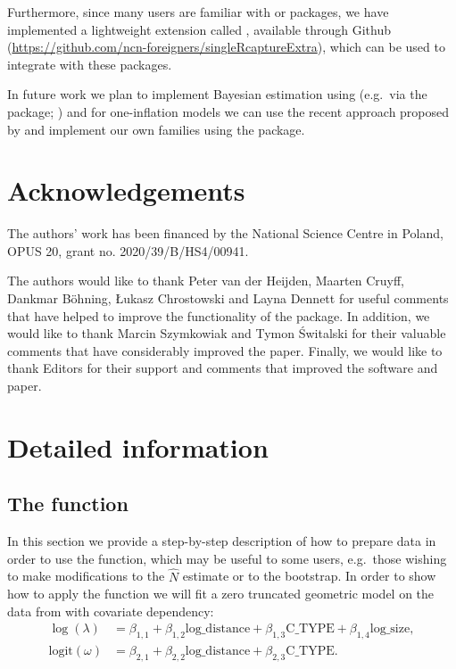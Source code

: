 \documentclass[
]{jss}
\newcommand{\1}{\mathcal{I}} \newcommand{\bZero}{\boldsymbol{0}}
\begin{document}
Furthermore, since many  users are familiar with
 or  packages, we have implemented a lightweight
extension called , available through Github
(\url{https://github.com/ncn-foreigners/singleRcaptureExtra}), which can
be used to integrate  with these packages.

In future work we plan to implement Bayesian estimation using
 (e.g.~via the  package;
\cite{carpenter2017stan, brms}) and for one-inflation models we can use
the recent approach proposed by \cite{tuoto2022bayesian} and implement
our own families using the  package.

\section{Acknowledgements}\label{Acknowledgements}

The authors' work has been financed by the National Science Centre in
Poland, OPUS 20, grant no. 2020/39/B/HS4/00941.

The authors would like to thank Peter van der Heijden, Maarten Cruyff,
Dankmar Böhning, Łukasz Chrostowski and Layna Dennett for useful
comments that have helped to improve the functionality of the package.
In addition, we would like to thank Marcin Szymkowiak and Tymon
Świtalski for their valuable comments that have considerably improved
the paper. Finally, we would like to thank Editors for their support and
comments that improved the software and paper.

\appendix

\section{Detailed information}\label{sec-details}

\subsection[The estimatePopsizeFit function]{The
 function}\label{sec-estimatePopsizeFit}

In this section we provide a step-by-step description of how to prepare
data in order to use the  function, which may
be useful to some users, e.g.~those wishing to make modifications to the
\(\hat{N}\) estimate or to the bootstrap. In order to show how to apply
the function we will fit a zero truncated geometric model on the data
from \citet{chao-generalization} with covariate dependency:
\begin{align*}
  \log(\lambda) &=
  \beta_{1, 1} + \beta_{1, 2} \text{log\_distance} + \beta_{1, 3} \text{C\_TYPE} +
  \beta_{1, 4} \text{log\_size}, \\
  \text{logit}(\omega) &=
  \beta_{2, 1} + \beta_{2, 2} \text{log\_distance} + \beta_{2, 3} \text{C\_TYPE}.
\end{align*}
\end{document}
